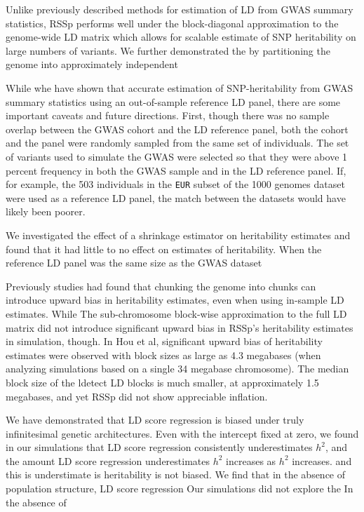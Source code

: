 Unlike previously described methods for estimation of LD from GWAS summary statistics, RSSp performs well under the block-diagonal approximation to the genome-wide LD matrix which allows for scalable estimate of SNP heritability on large numbers of variants. We further demonstrated the by partitioning the genome into approximately independent

While whe have shown that accurate estimation of SNP-heritability from GWAS summary statistics using an out-of-sample reference LD panel, there are some important caveats and future directions.  First, though there was no sample overlap between the GWAS cohort and the LD reference panel, both the cohort and the panel were randomly sampled from the same set of individuals.  The set of
variants used to simulate the GWAS were selected so that they were above 1 percent frequency in both the GWAS sample and in the LD reference panel.  If, for example, the 503 individuals in the \texttt{EUR} subset of the 1000 genomes dataset were used as a reference LD panel, the match between the datasets would have likely been poorer.

We investigated the effect of a shrinkage estimator on heritability estimates and found that it had little to no effect on estimates of heritability.  When the reference LD panel was the same size as the GWAS dataset

Previously studies had found that chunking the genome into chunks can introduce upward bias in heritability estimates, even when using in-sample LD estimates\cite{Hou_2019}.  While   The sub-chromosome block-wise approximation to the full LD matrix did not introduce significant upward bias in RSSp's heritability estimates in simulation, though.   In Hou et al, significant upward bias of heritability estimates were observed with block sizes as large as 4.3 megabases (when analyzing simulations based on a single 34 megabase chromosome).  The median block size of the ldetect LD blocks is much smaller, at approximately 1.5 megabases, and yet RSSp did not show appreciable inflation.

We have demonstrated that LD score regression is biased under truly infinitesimal genetic architectures.  Even with the intercept fixed at zero, we found in our simulations
that LD score regression consistently underestimates $h^2$, and the amount LD score regression underestimates $h^2$ increases as $h^2$ increases.
and this is understimate is
heritability is not biased.
We find that in the absence of population structure, LD score regression 
Our simulations did not explore the In the absence of 






